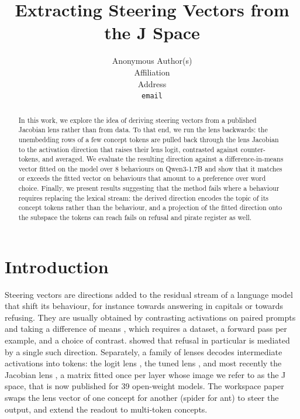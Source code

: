\documentclass{article}
\title{Extracting Steering Vectors from the J Space}
\author{%
  Anonymous Author(s) \\
  Affiliation \\
  Address \\
  \texttt{email} \\
}
\begin{document}
\maketitle

\begin{abstract}
  In this work, we explore the idea of deriving steering vectors from a published Jacobian lens rather than from data. To that end, we run the lens backwards: the unembedding rows of a few concept tokens are pulled back through the lens Jacobian to the activation direction that raises their lens logit, contrasted against counter-tokens, and averaged. We evaluate the resulting direction against a difference-in-means vector fitted on the model over 8 behaviours on Qwen3-1.7B and show that it matches or exceeds the fitted vector on behaviours that amount to a preference over word choice. Finally, we present results suggesting that the method fails where a behaviour requires replacing the lexical stream: the derived direction encodes the topic of its concept tokens rather than the behaviour, and a projection of the fitted direction onto the subspace the tokens can reach fails on refusal and pirate register as well.
\end{abstract}

\section{Introduction}

Steering vectors are directions added to the residual stream of a language model that shift its behaviour, for instance towards answering in capitals or towards refusing. They are usually obtained by contrasting activations on paired prompts and taking a difference of means \citep{turner2023actadd,rimsky2024caa,zou2023repe}, which requires a dataset, a forward pass per example, and a choice of contrast. \citet{arditi2024refusal} showed that refusal in particular is mediated by a single such direction. Separately, a family of lenses decodes intermediate activations into tokens: the logit lens \citep{nostalgebraist2020logitlens}, the tuned lens \citep{belrose2023tuned}, and most recently the Jacobian lens \citep{gurnee2026workspace}, a matrix fitted once per layer whose image we refer to as the J space, that is now published for 39 open-weight models. The workspace paper swaps the lens vector of one concept for another (spider for ant) to steer the output, and \citet{gong2026firsttoken} extend the readout to multi-token concepts.
\end{document}
